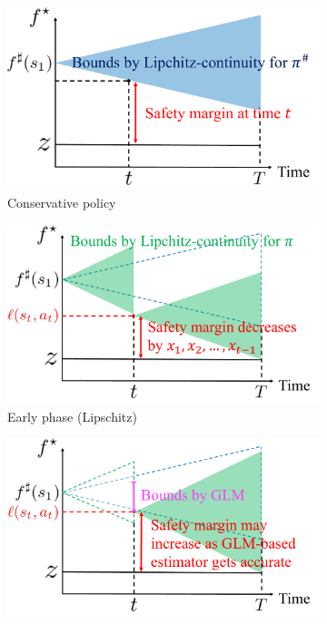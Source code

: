 \documentclass[letterpaper]{article} %
\begin{document}
\begin{figure}[t]
    \centering
    \begin{subfigure}[b]{0.33\textwidth}
        \centering
        \includegraphics[width=\textwidth]{figures/fig_1.pdf}
        \caption{Conservative policy}
        \label{fig:point_return}
    \end{subfigure}
    \hfill
    \begin{subfigure}[b]{0.33\textwidth}
        \centering
        \includegraphics[width=\textwidth]{figures/fig_2.pdf}
        \caption{Early phase (Lipschitz)}
        \label{fig:point_avecost}
    \end{subfigure}
    \hfill
    \begin{subfigure}[b]{0.33\textwidth}
        \centering
        \includegraphics[width=\textwidth]{figures/fig_3.pdf}

\end{subfigure}
\end{figure}
\end{document}
